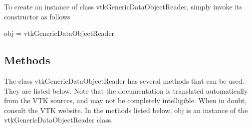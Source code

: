 To create an instance of class vtk\-Generic\-Data\-Object\-Reader, simply invoke its constructor as follows \begin{DoxyVerb}  obj = vtkGenericDataObjectReader
\end{DoxyVerb}
 \hypertarget{vtkwidgets_vtkxyplotwidget_Methods}{}\subsection{Methods}\label{vtkwidgets_vtkxyplotwidget_Methods}
The class vtk\-Generic\-Data\-Object\-Reader has several methods that can be used. They are listed below. Note that the documentation is translated automatically from the V\-T\-K sources, and may not be completely intelligible. When in doubt, consult the V\-T\-K website. In the methods listed below, {\ttfamily obj} is an instance of the vtk\-Generic\-Data\-Object\-Reader class. 

